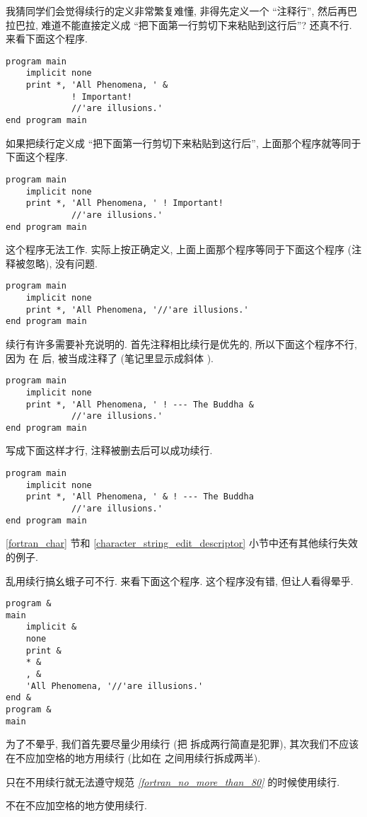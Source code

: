 我猜同学们会觉得续行的定义非常繁复难懂, 非得先定义一个 ``注释行'', 然后再巴拉巴拉, 难道不能直接定义成 ``把下面第一行剪切下来粘贴到这行后''? 还真不行. 来看下面这个程序.
\begin{lstlisting}
program main
    implicit none
    print *, 'All Phenomena, ' &
             ! Important!
             //'are illusions.'
end program main
\end{lstlisting}
如果把续行定义成 ``把下面第一行剪切下来粘贴到这行后'', 上面那个程序就等同于下面这个程序.
\begin{lstlisting}
program main
    implicit none
    print *, 'All Phenomena, ' ! Important!
             //'are illusions.'
end program main
\end{lstlisting}
这个程序无法工作. 实际上按正确定义, 上面上面那个程序等同于下面这个程序 (注释被忽略), 没有问题.
\begin{lstlisting}
program main
    implicit none
    print *, 'All Phenomena, '//'are illusions.'
end program main
\end{lstlisting}

续行有许多需要补充说明的. 首先注释相比续行是优先的, 所以下面这个程序不行, 因为 \ttt{\&{}} 在 \ttt{!} 后, 被当成注释了 (笔记里显示成斜体 \emph{\ttt{\&{}}}).
\begin{lstlisting}
program main
    implicit none
    print *, 'All Phenomena, ' ! --- The Buddha &
             //'are illusions.'
end program main
\end{lstlisting}
写成下面这样才行, 注释被删去后可以成功续行.
\begin{lstlisting}
program main
    implicit none
    print *, 'All Phenomena, ' & ! --- The Buddha
             //'are illusions.'
end program main
\end{lstlisting}
\ref{fortran_char} 节和 \ref{character_string_edit_descriptor} 小节中还有其他续行失效的例子.

乱用续行搞幺蛾子可不行. 来看下面这个程序. 这个程序没有错, 但让人看得晕乎.
\begin{lstlisting}
program &
main
    implicit &
    none
    print &
    * &
    , & 
    'All Phenomena, '//'are illusions.'
end &
program &
main
\end{lstlisting}
为了不晕乎, 我们首先要尽量少用续行 (把  拆成两行简直是犯罪), 其次我们不应该在不应加空格的地方用续行 (比如在 \ttt{*,} 之间用续行拆成两半).
\begin{convention}
    只在不用续行就无法遵守规范 \emph{\ref{fortran_no_more_than_80}} 的时候使用续行.
\end{convention}
\begin{convention}
    不在不应加空格的地方使用续行.
\end{convention}

